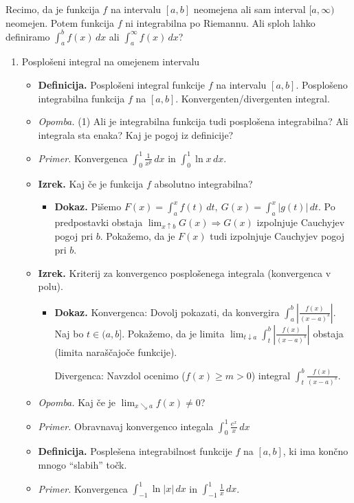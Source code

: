 Recimo, da je funkcija $f$ na intervalu $[a, b]$ neomejena ali sam interval $[a, \infty)$ neomejen. Potem funkcija $f$ ni integrabilna po Riemannu. Ali sploh lahko definiramo $\int_{a}^{b}f(x) \, dx$ ali $\int_{a}^{\infty} f(x) \, dx$?
\begin{enumerate}
    \item Posplošeni integral na omejenem intervalu
    \begin{itemize}
        \item \colorbox{purple!30}{\textbf{Definicija.}} Posplošeni integral funkcije $f$ na intervalu $[a,b]$. Posplošeno integrabilna funkcija $f$ na $[a,b]$. Konvergenten/divergenten integral.
        \item \colorbox{yellow!30}{\emph{Opomba.}} (1) Ali je integrabilna funkcija tudi posplošena integrabilna? Ali integrala sta enaka? Kaj je pogoj iz definicije?  
        \item \colorbox{yellow!30}{\emph{Primer.}} Konvergenca $\displaystyle \int_{0}^{1} \frac{1}{x^p}  \,dx $ in $\displaystyle \int_{0}^{1} \ln x  \,dx $.
        \item \colorbox{blue!30}{\textbf{Izrek.}} Kaj če je funkcija $f$ absolutno integrabilna?
        \begin{itemize}
            \item \colorbox{green!30}{\textbf{Dokaz.}} Pišemo $\displaystyle F(x) = \int_{a}^{x} f(t) \, dt, \ G(x) = \int_{a}^{x} |g(t)| \, dt$. Po predpostavki obstaja $\lim_{x \uparrow b} G(x) \Rightarrow G(x)$ izpolnjuje Cauchyjev pogoj pri $b$. Pokažemo, da je $F(x)$ tudi izpolnjuje Cauchyjev pogoj pri $b$. 
        \end{itemize}
        \item \colorbox{blue!30}{\textbf{Izrek.}} Kriterij za konvergenco posplošenega integrala (konvergenca v polu).
        \begin{itemize}
            \item \colorbox{green!30}{\textbf{Dokaz.}} Konvergenca: Dovolj pokazati, da konvergira $\int_{a}^{b} |\frac{f(x)}{(x-a)^s}|$. Naj bo $t \in (a, b]$. Pokažemo, da je limita $\lim_{t \downarrow a} \int_{t}^{b} |\frac{f(x)}{(x-a)^s}|$ obstaja (limita naraščajoče funkcije).
            
            Divergenca: Navzdol ocenimo ($f(x) \geq m > 0$) integral $\int_{t}^{b} \frac{f(x)}{(x-a)^s}$.
        \end{itemize}
        \item \colorbox{yellow!30}{\emph{Opomba.}} Kaj če je $\displaystyle \lim_{x \searrow a} f(x) \neq 0$?
        \item \colorbox{yellow!30}{\emph{Primer.}} Obravnavaj konvergenco integala $\int_{0}^{1}\frac{e^x}{x} \, dx$
        \item \colorbox{purple!30}{\textbf{Definicija.}} Posplešena integrabilnost funkcije $f$ na $[a,b]$, ki ima končno mnogo "`slabih"' točk.
        \item \colorbox{yellow!30}{\emph{Primer.}} Konvergenca $\displaystyle \int_{-1}^{1} \ln |x|  \,dx $ in $\displaystyle \int_{-1}^{1} \frac{1}{x}  \,dx $.
    \end{itemize}


\end{enumerate}

